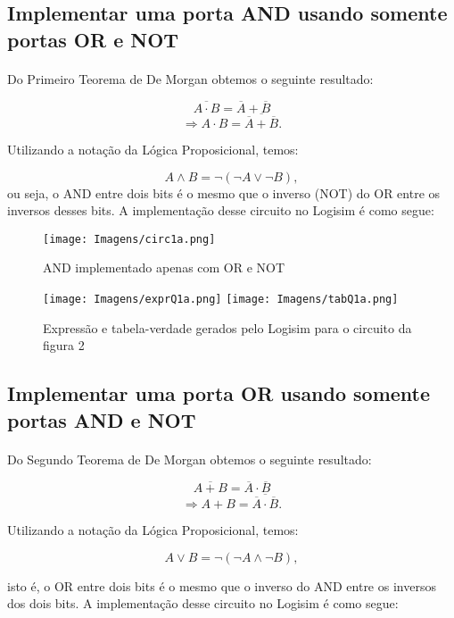 \documentclass[a4paper, 12pt]{article}
\begin{document}
\subsection{Implementar uma porta AND usando somente portas OR e NOT}
\paragraph{}
Do Primeiro Teorema de De Morgan obtemos o seguinte resultado:

\[
\overline{A \cdot B} = \overline{A} + \overline{B}
\]
\[
\Rightarrow A \cdot B = \overline{\overline{A} + \overline{B}}.
\]

\noindent Utilizando a notação da Lógica Proposicional, temos:

\[
A \land B = \lnot (\lnot A \lor \lnot B),
\]
ou seja, o AND entre dois bits é o mesmo que o inverso (NOT) do OR entre os inversos desses bits. A implementação desse circuito no Logisim é como segue:

\begin{figure}[H]
    \centering
    \texttt{[image: Imagens/circ1a.png]}
    \caption{AND implementado apenas com OR e NOT}
\end{figure}

\begin{figure}[H]
    \centering
    \texttt{[image: Imagens/exprQ1a.png]}
    \texttt{[image: Imagens/tabQ1a.png]} \\
    \caption{Expressão e tabela-verdade gerados pelo Logisim para o circuito da figura 2}
\end{figure}

\subsection{Implementar uma porta OR usando somente portas AND e NOT}
\paragraph{}
Do Segundo Teorema de De Morgan obtemos o seguinte resultado:

\[
\overline{A + B} = \overline{A} \cdot \overline{B}
\]
\[
\Rightarrow A + B = \overline{\overline{A} \cdot \overline{B}}.
\]

\noindent Utilizando a notação da Lógica Proposicional, temos:

\[
A \lor B = \lnot (\lnot A \land \lnot B),
\]

\noindent isto é, o OR entre dois bits é o mesmo que o inverso do AND entre os inversos dos dois bits. A implementação desse circuito no Logisim é como segue:
\end{document}
